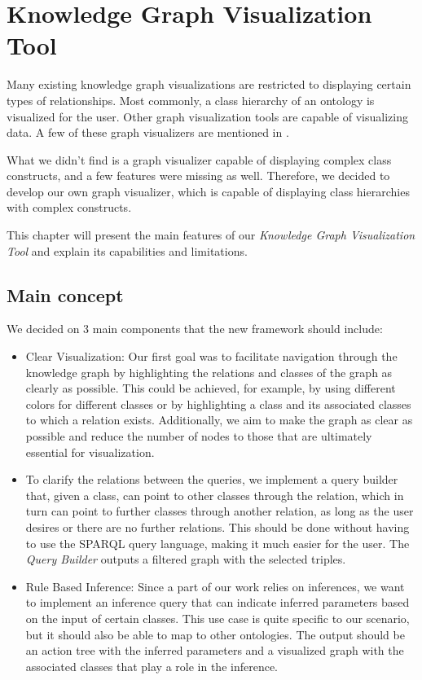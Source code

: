 \chapter{Knowledge Graph Visualization Tool}
\label{chap:OWLViz}
Many existing knowledge graph visualizations are restricted to displaying certain types of relationships. 
Most commonly, a class hierarchy of an ontology is visualized for the user. Other graph visualization tools are capable of visualizing data.
 A few of these graph visualizers are mentioned in .

What we didn't find is a graph visualizer capable of displaying complex class constructs, and a few features were missing as well.
Therefore, we decided to develop our own graph visualizer, which is capable of displaying class hierarchies with complex constructs.

This chapter will present the main features of our \textit{Knowledge Graph Visualization Tool} and explain its capabilities and limitations.

\section{Main concept}
\label{sec:MainConceps}

We decided on 3 main components that the new framework should include:
\begin{itemize}
    \item Clear Visualization: Our first goal was to facilitate navigation through the knowledge graph by highlighting the relations and classes of the graph as clearly as possible. This could be achieved, for example, by using different colors for different classes or by highlighting a class and its associated classes to which a relation exists. Additionally, we aim to make the graph as clear as possible and reduce the number of nodes to those that are ultimately essential for visualization.
    \item To clarify the relations between the queries, we implement a query builder that, given a class, can point to other classes through the relation, which in turn can point to further classes through another relation, as long as the user desires or there are no further relations. This should be done without having to use the SPARQL query language, making it much easier for the user. The \textit{Query Builder} outputs a filtered graph with the selected triples.
    \item Rule Based Inference: Since a part of our work relies on inferences, we want to implement an inference query that can indicate inferred parameters based on the input of certain classes. This use case is quite specific to our scenario, but it should also be able to map to other ontologies. The output should be an action tree with the inferred parameters and a visualized graph with the associated classes that play a role in the inference.
\end{itemize}

